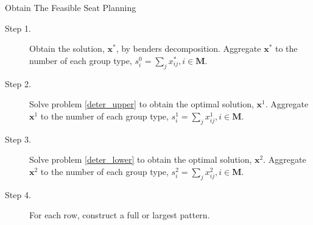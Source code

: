 \begin{frame}{Obtain The Feasible Seat Planning}
      \begin{description}
        \item[Step 1.] Obtain the solution, $\mathbf{x}^{*}$, by benders decomposition. Aggregate $\mathbf{x}^{*}$ to the number of each group type, ${s}_{i}^{0} =\sum_{j} x^{*}_{ij}, i \in \mathbf{M}$.

        \item[Step 2.] Solve problem \eqref{deter_upper} to obtain the optimal solution, $\mathbf{x}^{1}$. Aggregate $\mathbf{x}^{1}$ to the number of each group type, ${s}_{i}^{1} = \sum_{j} x^{1}_{ij}, i \in \mathbf{M}$.
        
        \item[Step 3.] Solve problem \eqref{deter_lower} to obtain the optimal solution, $\mathbf{x}^{2}$. Aggregate $\mathbf{x}^{2}$ to the number of each group type, ${s}_{i}^{2} = \sum_{j} x^{2}_{ij}, i \in \mathbf{M}$.
    
        \item[Step 4.] For each row, construct a full or largest pattern.
     \end{description}
\end{frame}